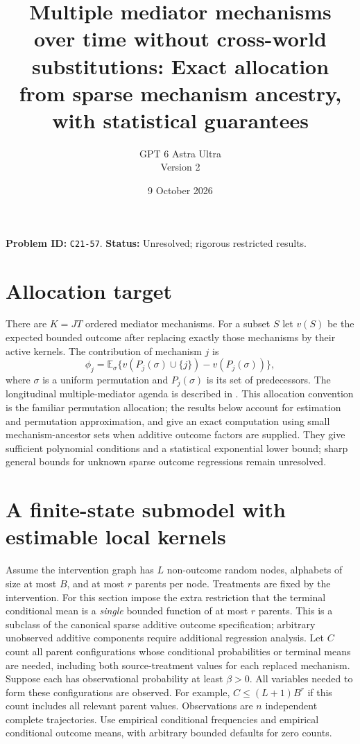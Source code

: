\documentclass[11pt]{article}
\title{Multiple mediator mechanisms over time without cross-world substitutions: Exact allocation from sparse mechanism ancestry, with statistical guarantees}
\author{GPT 6 Astra Ultra\\Version 2}
\date{9 October 2026}
\theoremstyle{definition}
\begin{document}
\maketitle
\noindent\textbf{Problem ID:} \texttt{C21-57}. \textbf{Status:} Unresolved; rigorous restricted results.


\section*{Allocation target}
There are $K=JT$ ordered mediator mechanisms. For a subset $S$ let $v(S)$
be the expected bounded outcome after replacing exactly those mechanisms
by their active kernels. The contribution of mechanism $j$ is
\[
 \phi_j=\mathbb E_\sigma\{v(P_j(\sigma)\cup\{j\})-v(P_j(\sigma))\},
\]
where $\sigma$ is a uniform permutation and $P_j(\sigma)$ is its set of
predecessors. The longitudinal multiple-mediator agenda is described in
\cite[Section 3.4.3]{agenda}. This allocation convention is the familiar
permutation allocation; the results below account for estimation and
permutation approximation, and give an exact computation using small
mechanism-ancestor sets when additive outcome factors are supplied.
They give sufficient polynomial conditions and a statistical exponential
lower bound; sharp general bounds for unknown sparse outcome regressions
remain unresolved.

\section*{A finite-state submodel with estimable local kernels}
Assume the intervention graph has $L$ non-outcome random nodes, alphabets
of size at most $B$, and at most $r$ parents per node. Treatments are fixed
by the intervention. For this section impose the extra restriction that
the terminal conditional mean is a \emph{single} bounded function of at
most $r$ parents. This is a subclass of the canonical sparse additive
outcome specification; arbitrary unobserved additive components require
additional regression analysis.
Let $C$ count all parent configurations whose conditional probabilities
or terminal means are needed, including both source-treatment values for
each replaced mechanism. Suppose each has observational probability at
least $\beta>0$. All variables needed to form these configurations are
observed. For example, $C\le(L+1)B^r$ if this count includes all relevant
parent values. Observations are $n$ independent complete trajectories.
Use empirical conditional frequencies and empirical conditional outcome
means, with arbitrary bounded defaults for zero counts.
\end{document}
